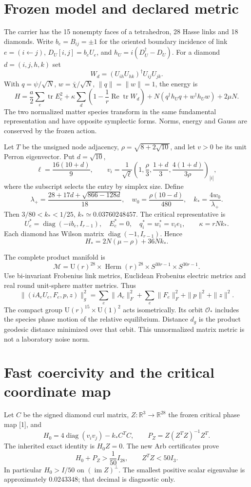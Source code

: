\documentclass[11pt,a4paper]{article}
\newcommand{\tr}{\operatorname{tr}}\newcommand{\diag}{\operatorname{diag}}\newcommand{\Rea}{\operatorname{Re}}
\begin{document}
\section{Frozen model and declared metric}
The carrier has the 15 nonempty faces of a tetrahedron, 28 Hasse links and 18 diamonds. Write $b_e=B_{ij}=\pm1$ for the oriented boundary incidence of link $e=(i\leftarrow j)$, $D_U[i,j]=b_eU_e$, and $h_U=i(D_U^\dagger-D_U)$. For a diamond $d=(i,j,h,k)$ set
\[
W_d=(U_{ih}U_{hk})^\dagger U_{ij}U_{jk}.
\]
With $q=\psi/\sqrt N$, $w=\bar\chi/\sqrt N$, $\|q\|=\|w\|=1$, the energy is
\[
H=\frac a2\sum_e\tr E_e^2+\kappa\sum_d\left(1-\frac1r\Rea\tr W_d\right)
+N(q^\dagger h_Uq+w^\dagger h_Uw)+2\mu N.
\]
The two normalized matter species transform in the same fundamental representation and have opposite symplectic forms. Norms, energy and Gauss are conserved by the frozen action.

Let $T$ be the unsigned node adjacency, $\rho=\sqrt{8+2\sqrt{10}}$, and let $v>0$ be its unit Perron eigenvector. Put $d=\sqrt{10}$,
\[
\ell=\frac{16(10+d)}9,\qquad
v_i=\frac1{\sqrt\ell}\left(1,\frac\rho3,\frac{1+d}3,
\frac{4(1+d)}{3\rho}\right)_{|i|},
\]
where the subscript selects the entry by simplex size. Define
\[
\lambda_+=\frac{28+17d+\sqrt{866-128d}}{18},\quad
w_0=\frac{\rho(10-d)}{480},\quad k_*=\frac{4w_0}{\lambda_+}.
\]
Then $3/80<k_*<1/25$, $k_*\simeq0.03760248457$. The critical representative is
\[
U_e^*=\diag(-ib_e,I_{r-1}),\quad E_e^*=0,\quad q_i^*=w_i^*=v_i e_1,
\qquad \kappa=rNk_*.
\]
Each diamond has Wilson matrix $\diag(-1,I_{r-1})$. Hence
\[
H_*=2N(\mu-\rho)+36Nk_*.
\]

The complete product manifold is
\[
\mathcal M=\mathrm U(r)^{28}\times\operatorname{Herm}(r)^{28}
\times S^{30r-1}\times S^{30r-1}.
\]
Use bi-invariant Frobenius link metrics, Euclidean Frobenius electric metrics and real round unit-sphere matter metrics. Thus
\[
\|(iA_eU_e,F_e,p,z)\|_g^2
=\sum_e\|A_e\|_F^2+\sum_e\|F_e\|_F^2+\|p\|^2+\|z\|^2.
\]
The compact group $\mathrm U(r)^{15}\times\mathrm U(1)^2$ acts isometrically. Its orbit $\mathcal O_*$ includes the species phase motion of the relative equilibrium. Distance $d_g$ is the product geodesic distance minimized over that orbit. This unnormalized matrix metric is not a laboratory noise norm.
\newpage
\section{Fast coercivity and the critical coordinate map}
Let $C$ be the signed diamond curl matrix, $Z:\mathbb R^3\to\mathbb R^{28}$ the frozen critical phase map [1], and
\[
H_0=4\diag(v_iv_j)-k_*C^TC,\qquad
P_Z=Z(Z^TZ)^{-1}Z^T.
\]
The inherited exact identity is $H_0Z=0$. The new Arb certificates prove
\begin{equation}\label{eq:matrixbounds}
\boxed{H_0+P_Z>\frac1{50}I_{28},\qquad Z^TZ<50I_3.}
\end{equation}
In particular $H_0> I/50$ on $(\operatorname{im}Z)^\perp$. The smallest positive scalar eigenvalue is approximately $0.0243348$; that decimal is diagnostic only.
\end{document}

